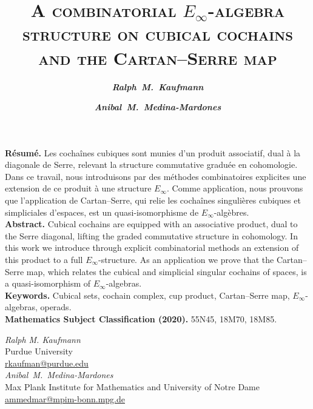 \documentclass[12pt]{article}
\title{\vskip 5pt  \bf  \textsc{A combinatorial $E_\infty$-algebra structure on cubical cochains and the Cartan--Serre map}}
\author{
	\itshape\bfseries {Ralph~M.~Kaufmann} \and
	\itshape\bfseries {Anibal~M.~Medina-Mardones}
}
\begin{document}
	\maketitle
	\cfoot{}
	\thispagestyle{empty}
	\vskip 25pt
	\begin{adjustwidth}{0.5cm}{0.5cm}
		{\small
			{\bf R\'esum\'e.} Les cochaînes cubiques sont munies d'un produit associatif, dual à la diagonale de Serre, relevant la structure commutative graduée en cohomologie.
			Dans ce travail, nous introduisons par des méthodes combinatoires explicites une extension de ce produit à une structure $E_\infty$.
			Comme application, nous prouvons que l'application de Cartan--Serre, qui relie les cochaînes singulières cubiques et simpliciales d'espaces, est un quasi-isomorphisme de $E_\infty$-algèbres. \\
			{\bf Abstract.} Cubical cochains are equipped with an associative product, dual to the Serre diagonal, lifting the graded commutative structure in cohomology.
			In this work we introduce through explicit combinatorial methods an extension of this product to a full $E_\infty$-structure.
			As an application we prove that the Cartan--Serre map, which relates the cubical and simplicial singular cochains of spaces, is a quasi-isomorphism of $E_\infty$-algebras. \\
			{\bf Keywords.} Cubical sets, cochain complex, cup product, Cartan--Serre map, $E_\infty$-algebras, operads. \\
			{\bf Mathematics Subject Classification (2020).} 55N45, 18M70, 18M85.
		}
	\end{adjustwidth}

	
	
	
	
	
	

	\sloppy
	\printbibliography

	\noindent \textit{Ralph M. Kaufmann} \\
	Purdue University \\
	\href{mailto:rkaufman@purdue.edu}{rkaufman@purdue.edu} \\
	\newline
	\noindent \textit{Anibal~M.~Medina-Mardones} \\
	Max Plank Institute for Mathematics and University of Notre Dame \\
	\href{mailto:ammedmar@mpim-bonn.mpg.de}{ammedmar@mpim-bonn.mpg.de}
\end{document}
